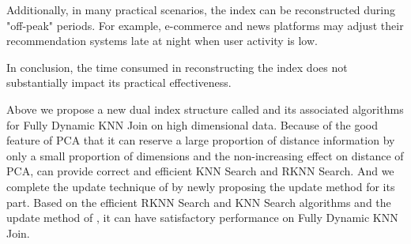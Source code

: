 Additionally, in many practical scenarios, the index can be reconstructed during "off-peak" periods. For example, e-commerce and news platforms may adjust their recommendation systems late at night when user activity is low. 

In conclusion, the time consumed in reconstructing the \dualtree index does not substantially impact its practical effectiveness.

Above we propose a new dual index structure called \dualtree and its associated algorithms for Fully Dynamic KNN Join on high dimensional data. Because of the good feature of PCA that it can reserve a large proportion of distance information by only a small proportion of dimensions and the non-increasing effect on distance of PCA, \dualtree can provide correct and efficient KNN Search and RKNN Search. And we complete the update technique of \dualtree by newly proposing the update method for its \hdrtree part. Based on the efficient RKNN Search and KNN Search algorithms and the update method of \dualtree, it can have satisfactory performance on Fully Dynamic KNN Join.

